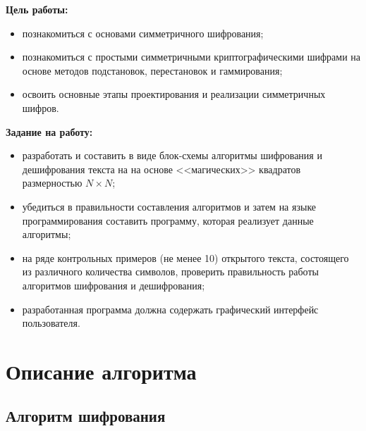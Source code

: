 \documentclass[utf8x, 14pt, bold, times]{G7-32} %
\begin{document}
\frontmatter %



\maketitle

\newpage
\tableofcontents

\nobreakingbeforechapters

\newpage
\Introduction

\textbf{Цель работы:}

\begin{itemize}
\item познакомиться с основами симметричного шифрования;
\item познакомиться с простыми симметричными криптографическими
      шифрами на основе методов подстановок, перестановок и гаммирования;
\item освоить основные этапы проектирования и реализации симметричных
      шифров.
\end{itemize}

\textbf{Задание на работу:}

\begin{itemize}
\item разработать и составить в виде блок-схемы алгоритмы шифрования и дешифрования текста
      на на основе <<магических>> квадратов размерностью $N \times N$;
\item убедиться в правильности составления алгоритмов и затем на языке
      программирования составить программу, которая реализует данные алгоритмы;
\item на ряде контрольных примеров (не менее 10) открытого текста, состоящего
      из различного количества символов, проверить правильность работы алгоритмов
      шифрования и дешифрования;
\item разработанная программа должна содержать графический интерфейс пользователя.
\end{itemize}


\mainmatter %
\newpage

\chapter{Описание алгоритма}

\section{Алгоритм шифрования}
\end{document}
